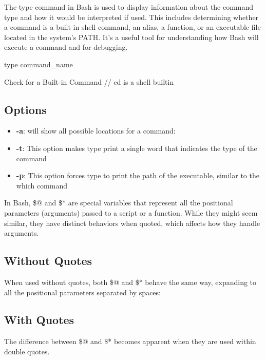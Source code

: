 \documentclass{report}
\begin{document}
    \pagebreak 
    \bigbreak \noindent 
    The type command in Bash is used to display information about the command type and how it would be interpreted if used. This includes determining whether a command is a built-in shell command, an alias, a function, or an executable file located in the system's PATH. It's a useful tool for understanding how Bash will execute a command and for debugging.
    \bigbreak \noindent 
    \begin{bashcode}
    type command_name
    \end{bashcode}
    \bigbreak \noindent 
    \begin{bashcode}
    Check for a Built-in Command // cd is a shell builtin
    \end{bashcode}
    \bigbreak \noindent 
    \subsection{Options}
    \begin{itemize}
        \item \textbf{-a}: will show all possible locations for a command:
        \item \textbf{-t}: This option makes type print a single word that indicates the type of the command
        \item \textbf{-p}: This option forces type to print the path of the executable, similar to the which command
    \end{itemize}

    \pagebreak 
    \bigbreak \noindent 
    In Bash, \$@ and \$* are special variables that represent all the positional parameters (arguments) passed to a script or a function. While they might seem similar, they have distinct behaviors when quoted, which affects how they handle arguments.
    \bigbreak \noindent 
    \subsection{Without Quotes}
    \bigbreak \noindent 
    When used without quotes, both \$@ and \$* behave the same way, expanding to all the positional parameters separated by spaces:

    \bigbreak \noindent 
    \subsection{With Quotes}
    The difference between \$@ and \$* becomes apparent when they are used within double quotes.
\end{document}
